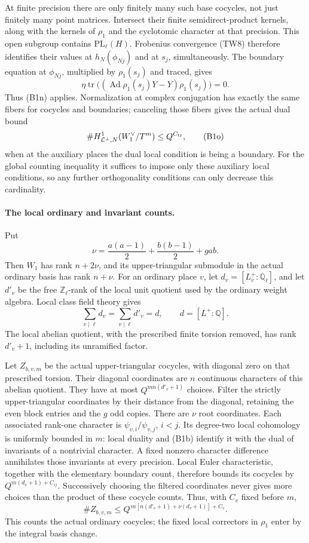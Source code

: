 At finite precision there are only finitely many such
base cocycles, not just finitely many point matrices.
Intersect their finite semidirect-product kernels, along
with the kernels of \(\rho_1\) and the cyclotomic character
at that precision.
This open subgroup contains \(\mathrm{PL}_\ell(H)\).
Frobenius convergence (TW8) therefore identifies their
values at \(h_N(\phi_{Nj})\) and at \(s_j\), simultaneously.
The boundary equation at \(\phi_{Nj}\), multiplied by
\(\rho_1(s_j)\) and traced, gives
\[
 \eta\operatorname{tr}\bigl(
   (\operatorname{Ad}\rho_1(s_j)Y-Y)\rho_1(s_j)\bigr)=0 .
\]
Thus (B1n) applies.
Normalization at complex conjugation has exactly the same
fibers for cocycles and boundaries; canceling those fibers
gives the actual dual bound
\[
       \#H^1_{\mathcal L^\perp,N}
                    (W_1^\vee/T^m)\leq Q^{C_{\rm tr}},
 \tag{B1o}
\]
when at the auxiliary places the dual local condition is
being a boundary.
For the global counting inequality it suffices to impose
only these auxiliary local conditions, so any further
orthogonality conditions can only decrease this cardinality.

\paragraph{The local ordinary and invariant counts.}
Put
\[
 \nu=\frac{a(a-1)}2+\frac{b(b-1)}2+gab .
\]
Then \(W_1\) has rank \(n+2\nu\), and its upper-triangular
submodule in the actual ordinary basis has rank \(n+\nu\).
For an ordinary place \(v\), let
\(d_v=[L^+_v:\mathbb Q_\ell]\), and let \(d'_v\) be the free
\(\mathbb Z_\ell\)-rank of the local unit quotient used by the
ordinary weight algebra.
Local class field theory gives
\[
                         \sum_{v\mid\ell}d_v
                        =\sum_{v\mid\ell}d'_v=d,
             \qquad d=[L^+:\mathbb Q].
 \tag{B1p}
\]
The local abelian quotient, with the prescribed finite torsion
removed, has rank \(d'_v+1\), including its unramified factor.

Let \(Z_{b,v,m}\) be the actual upper-triangular cocycles,
with diagonal zero on that prescribed torsion.
Their diagonal coordinates are \(n\) continuous characters
of this abelian quotient.
They have at most \(Q^{mn(d'_v+1)}\) choices.
Filter the strictly upper-triangular coordinates by their
distance from the diagonal, retaining the even block entries
and the \(g\) odd copies.
There are \(\nu\) root coordinates.
Each associated rank-one character is
\(\psi_{v,i}/\psi_{v,j}\), \(i<j\).
Its degree-two local cohomology is uniformly bounded in \(m\):
local duality and (B1b) identify it with the dual of invariants
of a nontrivial character.
A fixed nonzero character difference annihilates those
invariants at every precision.
Local Euler characteristic, together with the elementary
boundary count, therefore bounds its cocycles by
\(Q^{m(d_v+1)+C_{ij}}\).
Successively choosing the filtered coordinates never gives
more choices than the product of these cocycle counts.
Thus, with \(C_v\) fixed before \(m\),
\[
 \#Z_{b,v,m}\leq
       Q^{\,m[n(d'_v+1)+\nu(d_v+1)]+C_v}.
 \tag{B1q}
\]
This counts the actual ordinary cocycles; the fixed local
correctors in \(\rho_1\) enter by the integral basis change.

